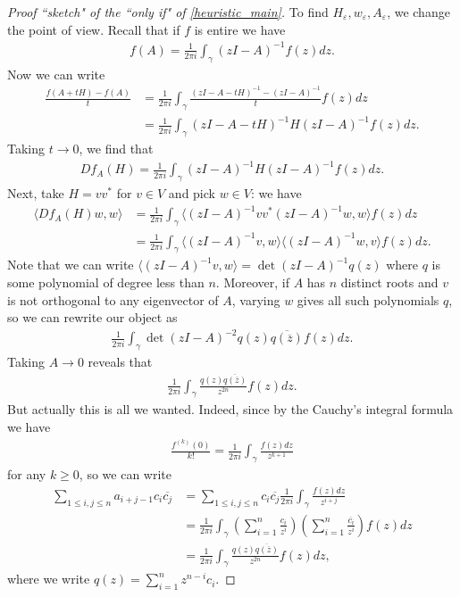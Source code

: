 \begin{proof}[Proof ``sketch" of the ``only if" of \ref{heuristic_main}]
	To find $H_{\varepsilon}, w_{\varepsilon}, A_{\varepsilon}$, we change the point of view. Recall that if $f$ is entire we have
	\begin{align*}
		f(A) = \frac{1}{2 \pi i}\int_{\gamma} (z I - A)^{-1} f(z) dz.
	\end{align*}
	Now we can write
	\begin{align*}
		\frac{f(A + t H) - f(A)}{t} &= \frac{1}{2 \pi i}\int_{\gamma} \frac{(z I - A - t H)^{-1} - (z I - A)^{-1}}{t} f(z) dz \\
		&= \frac{1}{2 \pi i}\int_{\gamma} (z I - A - t H)^{-1} H (z I - A)^{-1} f(z) dz.
	\end{align*}
	Taking $t \to 0$, we find that
	\begin{align*}
		D f_{A}(H) = \frac{1}{2 \pi i}\int_{\gamma} (z I - A)^{-1} H (z I - A)^{-1} f(z) dz.
	\end{align*}
	Next, take $H = v v^{*}$ for $v \in V$ and pick $w \in V$: we have
	\begin{align*}
		\langle D f_{A}(H) w, w \rangle &= \frac{1}{2 \pi i}\int_{\gamma} \langle (z I - A)^{-1} v v^{*} (z I - A)^{-1} w, w \rangle f(z) dz \\
		&= \frac{1}{2 \pi i}\int_{\gamma} \langle (z I - A)^{-1} v, w \rangle \langle (z I - A)^{-1} w, v \rangle f(z) dz.
	\end{align*}
	Note that we can write $\langle (z I - A)^{-1} v, w \rangle = \det(z I - A)^{-1} q(z)$ where $q$ is some polynomial of degree less than $n$. Moreover, if $A$ has $n$ distinct roots and $v$ is not orthogonal to any eigenvector of $A$, varying $w$ gives all such polynomials $q$, so we can rewrite our object as
	\begin{align}\label{loewner_integral}
		\frac{1}{2 \pi i}\int_{\gamma} \det(z I - A)^{-2} q(z) \overline{q(\overline{z})} f(z) dz.
	\end{align}
	Taking $A \to 0$ reveals that
	\begin{align*}
		\frac{1}{2 \pi i}\int_{\gamma} \frac{q(z) \overline{q(\overline{z})}}{z^{2 n}} f(z) dz.
	\end{align*}
	But actually this is all we wanted. Indeed, since by the Cauchy's integral formula we have
	\begin{align*}
		\frac{f^{(k)}(0)}{k!} = \frac{1}{2 \pi i} \int_{\gamma} \frac{f(z) d z}{z^{k + 1}}
	\end{align*}
	for any $k \geq 0$, so we can write
	\begin{align*}
		\sum_{1 \leq i, j \leq n} a_{i + j - 1} c_{i} \overline{c_{j}} &= \sum_{1 \leq i, j \leq n} c_{i} \overline{c_{j}} \frac{1}{2 \pi i} \int_{\gamma} \frac{f(z) d z}{z^{i + j}} \\
		&= \frac{1}{2 \pi i} \int_{\gamma} \left(\sum_{i = 1}^{n} \frac{c_{i}}{z^{i}} \right) \left(\sum_{i = 1}^{n} \frac{\overline{c_{i}}}{z^{i}} \right)f(z) dz \\
		&= \frac{1}{2 \pi i} \int_{\gamma}  \frac{q(z) \overline{q(\overline{z})}}{z^{2 n}} f(z) dz,
	\end{align*}
	where we write $q(z) = \sum_{i = 1}^{n} z^{n - i} c_{i}$.
\end{proof}

